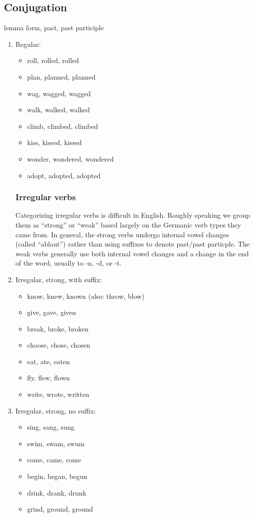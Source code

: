 \documentclass{article}
\begin{document}
\subsection{Conjugation}
lemma form, past, past participle
\begin{enumerate}
\item Regular:
\begin{itemize}
\item roll, rolled, rolled
\item plan, planned, planned
\item wag, wagged, wagged
\item walk, walked, walked
\item climb, climbed, climbed
\item kiss, kissed, kissed
\item wonder, wondered, wondered
\item adopt, adopted, adopted

\end{itemize}

\subsubsection{Irregular verbs}

Categorizing irregular verbs is difficult in English. Roughly speaking we group them as ``strong'' or ``weak'' based largely on the Germanic verb types they came from. In general, the strong verbs undergo internal vowel changes (called ``ablaut'') rather than using suffixes to denote past/past particple. The weak verbs generally use both internal vowel changes and a change in the end of the word, usually to -n, -d, or -t. 

\item Irregular, strong, with suffix:
\begin{itemize}
\item know, knew, known (also: throw, blow)
\item give, gave, given
\item break, broke, broken
\item choose, chose, chosen
\item eat, ate, eaten
\item fly, flew, flown
\item write, wrote, written
\end{itemize}

\item Irregular, strong, no suffix:
\begin{itemize}
\item sing, sang, sung
\item swim, swam, swum
\item come, came, come
\item begin, began, begun
\item drink, drank, drunk
\item grind, ground, ground
\end{itemize}


\end{enumerate}
\end{document}
